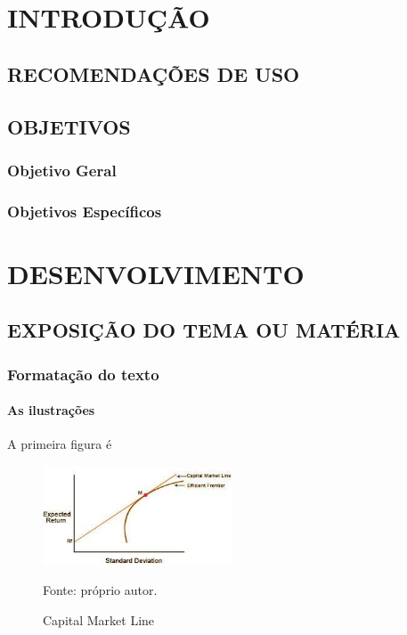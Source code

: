 \documentclass[12pt, a4paper]{article}
\begin{document}
        \thispagestyle{empty}
        \null\vfil
        \pagebreak

    \pagestyle{myheadings} %

    \section{INTRODUÇÃO}
        
        \subsection{RECOMENDAÇÕES DE USO}

        \subsection{OBJETIVOS}

        \subsubsection{Objetivo Geral}
        
        \subsubsection{Objetivos Específicos}
    
    \section{DESENVOLVIMENTO}
        \subsection{EXPOSIÇÃO DO TEMA OU MATÉRIA}
        \subsubsection{Formatação do texto}
        \paragraph{As ilustrações}

            \noindent A primeira figura é 

            \begin{figure}[htp]
                \centering
                \caption{Capital Market Line}
                \includegraphics[width=0.5\textwidth]{./imagens/cml.jpg}
                \par \footnotesize Fonte: próprio autor.
                \label{fig:cml}
            \end{figure}
\end{document}
